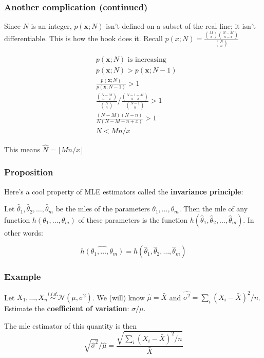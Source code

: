 \documentclass{beamer}
\begin{document}
\begin{frame}
\frametitle{Another complication (continued)}

Since $N$ is an integer, $p(\mathbf{x};N)$ isn't defined on a subset of the real line; it isn't differentiable. This is how the book does it. Recall $p(x;N) = \frac{{M \choose x}{N-M \choose n-x } }{{N \choose n }}$

\begin{align*}
&p(\mathbf{x};N)  \text{ is increasing} \\
&p(\mathbf{x};N) > p(\mathbf{x};N-1) \\
&\frac{ p(\mathbf{x};N) }{ p(\mathbf{x};N-1) } > 1 \\
&\frac{{N-M \choose n-x }}{{N \choose n} } \bigg/ \frac{{N - 1-M \choose n-x }}{{N - 1 \choose n} }  > 1 \\
&\frac{(N-M)(N-n)}{N(N-M-n+x)} > 1 \\
&N < Mn/x
\end{align*}

This means $\hat{N} = \lfloor{Mn/x} \rfloor$

\end{frame}


\begin{frame}
\frametitle{Proposition}

Here's a cool property of MLE estimators called the \textbf{invariance principle}:
\newline

Let $\hat{\theta}_1, \hat{\theta}_2, \ldots, \hat{\theta}_m$ be the mles of the parameters $\theta_1, \ldots, \theta_m$. Then the mle of any function $h(\theta_1, \ldots, \theta_m)$ of these parameters is the function $h(\hat{\theta}_1, \hat{\theta}_2, \ldots, \hat{\theta}_m)$. In other words:

\[
\widehat{h(\theta_1, \ldots, \theta_m)} = h(\hat{\theta}_1, \hat{\theta}_2, \ldots, \hat{\theta}_m)
\]


\end{frame}


\begin{frame}
\frametitle{Example}

Let $X_1, \ldots, X_n \overset{i.i.d.}{\sim} \mathcal{N}(\mu, \sigma^2)$. We (will) know $\hat{\mu} = \bar{X}$ and $\hat{\sigma^2} = \sum_i(X_i - \bar{X})^2 / n$. Estimate the \textbf{coefficient of variation}: $\sigma/\mu$.
\newline
\pause

The mle estimator of this quantity is then 
\[
\sqrt{\hat{\sigma}^2 }/ \hat{\mu}  = \frac{\sqrt{\sum_i(X_i - \bar{X})^2 / n} }{\bar{X}}
\]

\end{frame}
\end{document}
